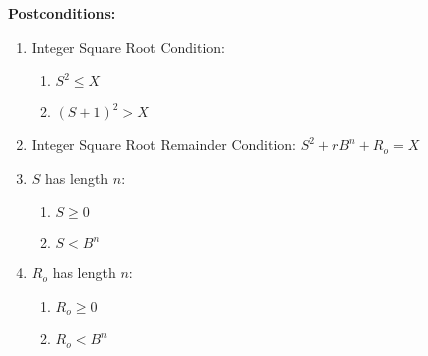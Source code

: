 \documentclass[%
    a4paper,%
]{article}
\makeatletter
\newenvironment*{algo}{%
    \newcommand*\algo@noNextParskip{%
        \vspace{-\parskip}%
    }%
    \newcommand*\algo@section{\textbf}%
    \newcommand*\Syntax{%
        \algo@section{Syntax:} %
    }%
    \newcommand*\Input{%
        \algo@section{Input:}%
        \algo@noNextParskip%
    }%
    \newcommand*\PreConditions{%
        \algo@section{Preconditions:}%
        \algo@noNextParskip%
    }%
    \newcommand*\Output{%
        \algo@section{Output:}%
        \algo@noNextParskip%
    }%
    \newcommand*\PostConditions{%
        \algo@section{Postconditions:}%
        \algo@noNextParskip%
    }%
    \newcommand*\DeducedPostConditions{%
        \algo@section{Deduced Postconditions:}%
        \algo@noNextParskip%
    }%
    \newcommand*\Algorithm{%
        \algo@section{Algorithm:}%
        \algo@noNextParskip%
    }%
}{%
}
\makeatother
\begin{document}
\begin{algo}
\PostConditions
\begin{enumerate}
\item Integer Square Root Condition:
    \begin{enumerate}
    \item $S^2 \le X$
    \item $(S+1)^2 > X$
    \end{enumerate}
\item Integer Square Root Remainder Condition: $S^2 + rB^n + R_o = X$
\item $S$ has length $n$:
    \begin{enumerate}
    \item $S \ge 0$
    \item $S < B^n$
    \end{enumerate}
\item $R_o$ has length $n$:
    \begin{enumerate}
    \item $R_o \ge 0$
    \item $R_o < B^n$
    \end{enumerate}
\end{enumerate}


\end{algo}
\end{document}
